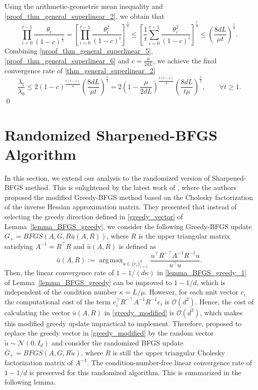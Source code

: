 \documentclass[11pt]{article}
\DeclareMathOperator*{\argmax}{arg\,max}
\numberwithin{assumption}{section}
\numberwithin{remark}{section}
\numberwithin{theorem}{section}
\begin{document}
Using the arithmetic-geometric mean inequality and \eqref{proof_thm_general_superlinear_2}, we obtain that
\begin{equation}\label{proof_thm_general_superlinear_6}
    \prod_{i = 0}^{t - 1}\frac{\theta_i}{(1 - c)^{\frac{i}{2}}} = \left[\prod_{i = 0}^{t - 1}\frac{\theta^2_i}{(1 - c)^i}\right]^{\frac{1}{2}} \leq \left[\frac{1}{t}\sum_{i = 0}^{t - 1}\frac{\theta^2_i}{(1 - c)^i}\right]^{\frac{t}{2}} \leq \left(\frac{8dL}{\mu t}\right)^{\frac{t}{2}}.
\end{equation}
Combining \eqref{proof_thm_general_superlinear_5}, \eqref{proof_thm_general_superlinear_6} and $c = \frac{\mu}{2dL}$, we achieve the final convergence rate of \eqref{thm_general_superlinear_2}
\begin{equation}
\frac{\lambda_t}{\lambda_0} \leq 2(1 - c)^{\frac{t(t - 1)}{4}}\left(\frac{8dL}{\mu t}\right)^{\frac{t}{2}} = 2(1 - \frac{\mu}{2dL})^{\frac{t(t - 1)}{4}} (\frac{8dL}{t\mu})^{\frac{t}{2}}, \qquad \forall t \geq 1.
\end{equation}\hfill \qed

\section{Randomized Sharpened-BFGS Algorithm}\label{sec:random}

In this section, we extend our analysis to the randomized version of Sharpened-BFGS method. This is enlightened by the latest work of \cite{zhangzhihua2021quasinewton1}, where the authors proposed the modified Greedy-BFGS method based on the Cholesky factorization of the inverse Hessian approximation matrix. They presented that instead of selecting the greedy direction defined in \eqref{greedy_vector} of Lemma~\ref{lemma_BFGS_greedy}, we consider the following Greedy-BFGS update $G_+ = BFGS(A, G, R\bar{u}(A, R))$, where $R$ is the upper triangular matrix satisfying $A^{-1} = R^\top R$ and $\bar{u}(A, R)$ is defined as
\begin{equation}\label{greedy_modified}
    \bar{u}(A, R) := \argmax_{u \in \{e_i\}_{i = 1}^{d}} \frac{u^\top R^{-\top} A^{-1}R^{-1} u}{u^\top u}.
\end{equation}
Then, the linear convergence rate of $1 - 1/(d\kappa)$ in \eqref{lemma_BFGS_greedy_1} of Lemma~\ref{lemma_BFGS_greedy} can be improved to $1 - 1/d$, which is independent of the condition number $\kappa = L/\mu$. However, for each unit vector $e_i$ the computational cost of the term $e_i^\top R^{-\top} A^{-1}R^{-1} e_i$ is $\mathcal{O}(d^2)$. Hence, the cost of calculating the vector $\bar{u}(A, R)$ in \eqref{greedy_modified} is $\mathcal{O}(d^3)$, which makes this modified greedy update impractical to implement. Therefore, \cite{zhangzhihua2021quasinewton1} proposed to replace the greedy vector in \eqref{greedy_modified} by the random vector $\tilde{u} \sim \mathcal{N}(0, I_d)$ and consider the randomized BFGS update $\bar{G}_+ = BFGS(A, G, R\tilde{u})$, where $R$ is still the upper triangular Cholesky factorization matrix of $A^{-1}$. The condition-number-free linear convergence rate of $1 - 1/d$ is preserved for this randomized algorithm. This is summarized in the following lemma.
\end{document}
